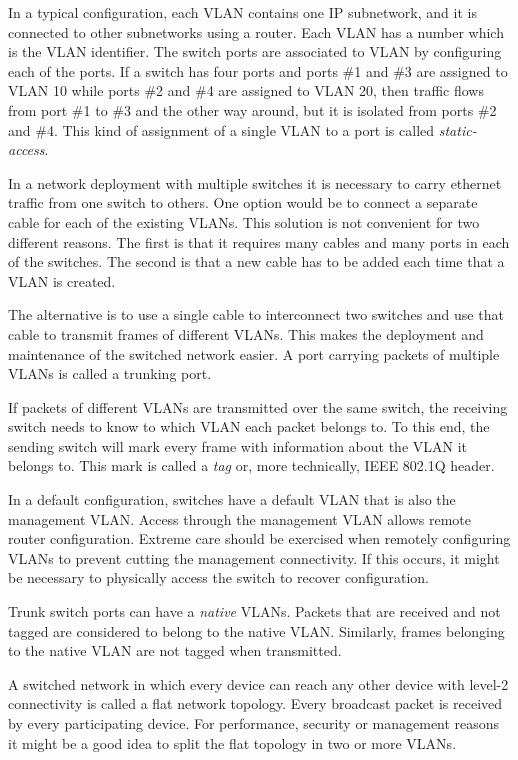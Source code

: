 In a typical configuration, each VLAN contains one IP subnetwork, and it is connected to other subnetworks using a router.
Each VLAN has a number which is the VLAN identifier.
The switch ports are associated to VLAN by configuring each of the ports.  
If a switch has four ports and ports \#1 and \#3 are assigned to VLAN 10 while ports \#2 and \#4 are assigned to VLAN 20, then traffic flows from port \#1 to \#3 and the other way around, but it is isolated from ports \#2 and \#4.
This kind of assignment of a single VLAN to a port is called \emph{static-access}.


In a network deployment with multiple switches it is necessary to carry ethernet traffic from one switch to others.
One option would be to connect a separate cable for each of the existing VLANs. 
This solution is not convenient for two different reasons.
The first is that it requires many cables and many ports in each of the switches.
The second is that a new cable has to be added each time that a VLAN is created.

The alternative is to use a single cable to interconnect two switches and use that cable to transmit frames of different VLANs.
This makes the deployment and maintenance of the switched network easier.
A port carrying packets of multiple VLANs is called a trunking port.

If packets of different VLANs are transmitted over the same switch, the receiving switch needs to know to which VLAN each packet belongs to.
To this end, the sending switch will mark every frame with information about the VLAN it belongs to.
This mark is called a \emph{tag} or, more technically, IEEE 802.1Q header.

In a default configuration, switches have a default VLAN that is also the management VLAN.
Access through the management VLAN allows remote router configuration.
Extreme care should be exercised when remotely configuring VLANs to prevent cutting the management connectivity.
If this occurs, it might be necessary to physically access the switch to recover configuration.

Trunk switch ports can have a \emph{native} VLANs.
Packets that are received and not tagged are considered to belong to the native VLAN.
Similarly, frames belonging to the native VLAN are not tagged when transmitted.


A switched network in which every device can reach any other device with level-2 connectivity is called a flat network topology.
Every broadcast packet is received by every participating device.
For performance, security or management reasons it might be a good idea to split the flat topology in two or more VLANs.

